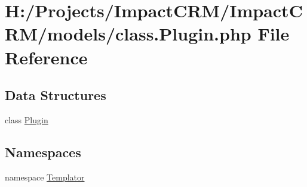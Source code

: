 \hypertarget{class_8Plugin_8php}{
\section{H:/Projects/ImpactCRM/ImpactCRM/models/class.Plugin.php File Reference}
\label{class_8Plugin_8php}
}
\subsection*{Data Structures}
\begin{DoxyCompactItemize}
\item 
class \hyperlink{classPlugin}{Plugin}
\end{DoxyCompactItemize}
\subsection*{Namespaces}
\begin{DoxyCompactItemize}
\item 
namespace \hyperlink{namespaceTemplator}{Templator}
\end{DoxyCompactItemize}
